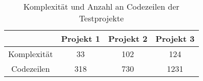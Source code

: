 \bgroup
\def\arraystretch{2}
\begin{table}[!h]
	\vspace{.5cm}
	\begin{center}
		\begin{tabular}{|c||c|c|c|}
			\hline 
			& Projekt 1 & Projekt 2 & Projekt 3 \\
			\hline 
			\hline
			Komplexität & 33 & 102 & 124 \\
			\hline
			Codezeilen & 318 & 730 & 1231 \\
			\hline
		\end{tabular} 
	\end{center}
	\caption{Komplexität und Anzahl an Codezeilen der Testprojekte}
	\label{fig:project}
\end{table}
\egroup